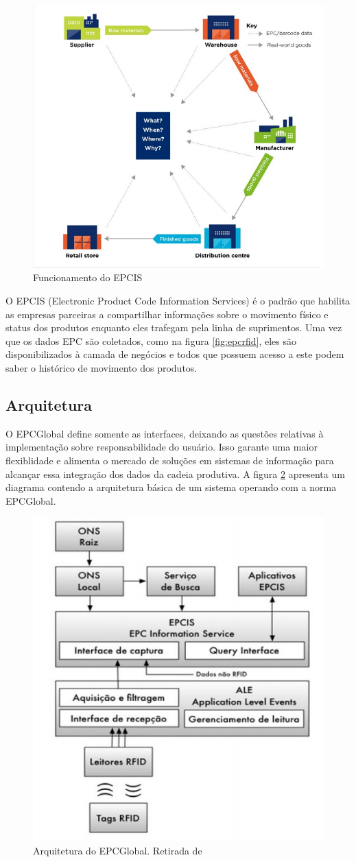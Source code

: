 \documentclass[a4paper,12pt,titlepage]{article}
\begin{document}
	
	\begin{figure}[h!]
		\centering
		\includegraphics[width=0.5\linewidth]{epcis}
		\caption{Funcionamento do EPCIS}
		\label{fig:epcis}
	\end{figure}
	
	O EPCIS (Electronic Product Code Information Services) é o padrão que habilita as empresas parceiras a compartilhar informações sobre o movimento físico e status dos produtos enquanto eles trafegam pela linha de suprimentos. Uma vez que os dados EPC são coletados, como na figura \ref{fig:epcrfid}, eles são disponibilizados à camada de negócios e todos que possuem acesso a este podem saber o histórico de movimento dos produtos. 
	
	\subsection{Arquitetura}

	O EPCGlobal define somente as interfaces, deixando as questões relativas à implementação sobre responsabilidade do usuário. Isso garante uma maior flexiblidade e alimenta o mercado de soluções em sistemas de informação para alcançar essa integração dos dados da cadeia produtiva. A figura \ref{fig:epcarc} apresenta um diagrama contendo a arquitetura básica de um sistema operando com a norma EPCGlobal.

	\begin{figure}[h!]
		\centering
		\includegraphics[width=0.5\linewidth]{epcarc}
		\caption{Arquitetura do EPCGlobal. Retirada de \cite{epcSobCug} }
		\label{fig:epcarc}
	\end{figure}
	
\end{document}
